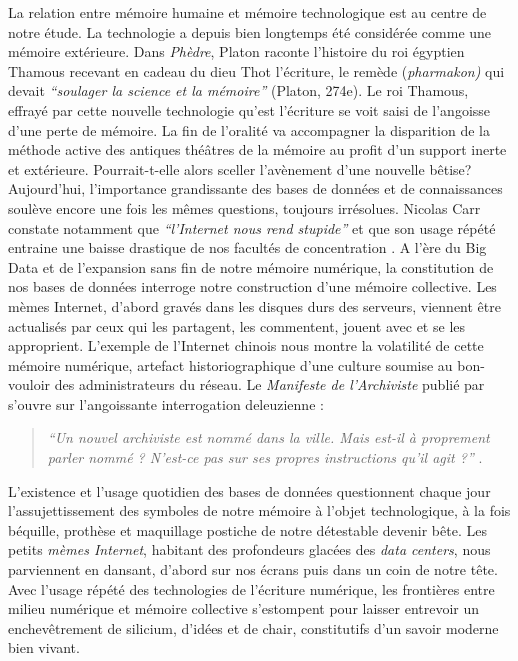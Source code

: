 La relation entre mémoire humaine et mémoire technologique est au centre de notre étude. La technologie a depuis bien longtemps été considérée comme une mémoire extérieure. Dans \textit{Phèdre}, Platon raconte l{\textquoteright}histoire du roi égyptien Thamous recevant en cadeau du dieu Thot l{\textquoteright}écriture, le remède (\textit{pharmakon) }qui devait \textit{{\textquotedblleft}soulager la science et la mémoire{\textquotedblright} }(Platon, 274e). Le roi Thamous, effrayé par cette nouvelle technologie qu'est l'écriture se voit saisi de l{\textquoteright}angoisse d{\textquoteright}une perte de mémoire. La fin de l'oralité va accompagner la disparition de la méthode active des antiques thé\^atres de la mémoire au profit d{\textquoteright}un support inerte et extérieure. Pourrait-t-elle alors sceller l{\textquoteright}avènement d{\textquoteright}une nouvelle bêtise? Aujourd{\textquoteright}hui, l{\textquoteright}importance grandissante des bases de données et de connaissances soulève encore une fois les mêmes questions, toujours irrésolues. Nicolas Carr constate notamment que \textit{{\textquotedblleft}l{\textquoteright}Internet nous rend stupide{\textquotedblright}} et que son usage répété entraine une baisse drastique de nos facultés de concentration \citep{Carr2010}. A l{\textquoteright}ère du Big Data et de l{\textquoteright}expansion sans fin de notre mémoire numérique, la constitution de nos bases de données interroge notre construction d{\textquoteright}une mémoire collective. Les mèmes Internet, d{\textquoteright}abord gravés dans les disques durs des serveurs, viennent être actualisés par ceux qui les partagent, les commentent, jouent avec et se les approprient. L{\textquoteright}exemple de l{\textquoteright}Internet chinois nous montre la volatilité de cette mémoire numérique, artefact historiographique d{\textquoteright}une culture soumise au bon-vouloir des administrateurs du réseau. Le \textit{Manifeste de l{\textquoteright}Archiviste} publié par \cite{Hui2014} s{\textquoteright}ouvre sur l{\textquoteright}angoissante interrogation deleuzienne :  

\begin{quote}
\textit{
    ``Un nouvel archiviste est nommé dans la ville. Mais est-il à proprement parler nommé ? N'est-ce pas sur ses propres instructions qu'il agit ?''
}
\citep{Deleuze1972a}.
\end{quote}

L{\textquoteright}existence et l{\textquoteright}usage quotidien des bases de données questionnent chaque jour l{\textquoteright}assujettissement des symboles de notre mémoire à l{\textquoteright}objet technologique, à la fois béquille, prothèse et maquillage postiche de notre détestable devenir bête. Les petits \textit{mèmes Internet}, habitant des profondeurs glacées des \textit{data centers}, nous parviennent en dansant, d{\textquoteright}abord sur nos écrans puis dans un coin de notre tête. Avec l{\textquoteright}usage répété des technologies de l{\textquoteright}écriture numérique, les frontières entre milieu numérique et mémoire collective s{\textquoteright}estompent pour laisser entrevoir un enchevêtrement de silicium, d{\textquoteright}idées et de chair, constitutifs d'un savoir moderne bien vivant.


